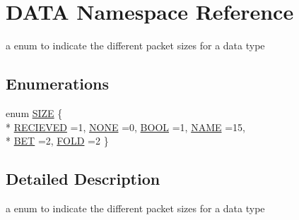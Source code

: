 \hypertarget{namespaceDATA}{\section{D\-A\-T\-A Namespace Reference}
\label{namespaceDATA}
}


a enum to indicate the different packet sizes for a data type  


\subsection*{Enumerations}
\begin{DoxyCompactItemize}
\item 
enum \hyperlink{namespaceDATA_afea3c4ba3d52fd5a891ad43a8dd5e14b}{S\-I\-Z\-E} \{ \\*
\hyperlink{namespaceDATA_afea3c4ba3d52fd5a891ad43a8dd5e14ba4e0d7a0787f6c2ff1bf5948bad3ec594}{R\-E\-C\-I\-E\-V\-E\-D} =1, 
\hyperlink{namespaceDATA_afea3c4ba3d52fd5a891ad43a8dd5e14ba665b1f18ef1c4ad7c65f51016b44a59e}{N\-O\-N\-E} =0, 
\hyperlink{namespaceDATA_afea3c4ba3d52fd5a891ad43a8dd5e14babe85d3ae61464479149b9d9f1c916f2b}{B\-O\-O\-L} =1, 
\hyperlink{namespaceDATA_afea3c4ba3d52fd5a891ad43a8dd5e14ba5153076cd7a27382f8e53a9b0b909102}{N\-A\-M\-E} =15, 
\\*
\hyperlink{namespaceDATA_afea3c4ba3d52fd5a891ad43a8dd5e14baffee9f305ff525f7f322246b140a163a}{B\-E\-T} =2, 
\hyperlink{namespaceDATA_afea3c4ba3d52fd5a891ad43a8dd5e14ba75b166f2085fa3bf8f36fdc32c9edede}{F\-O\-L\-D} =2
 \}
\end{DoxyCompactItemize}


\subsection{Detailed Description}
a enum to indicate the different packet sizes for a data type 

